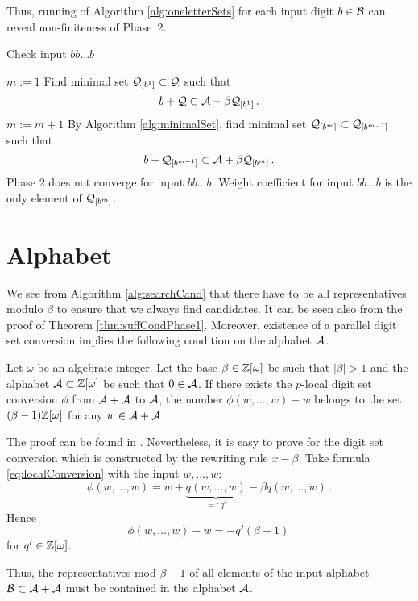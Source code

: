 Thus, running of Algorithm \ref{alg:oneletterSets} for each input digit $b\in\mathcal{B}$ can reveal non-finiteness of Phase~2.

\begin{algorithm}
  \caption{Check input $bb\dots b$}
    \label{alg:oneletterSets}
  \begin{algorithmic}[1]
    \STATE $m:=1$
    \STATE Find minimal set $\mathcal{Q}_{[b^{1}]} \subset \mathcal{Q}$ such that
      $$
      b + \mathcal{Q} \subset \mathcal{A} + \beta \mathcal{Q}_{[b^{1}]}\,.
      $$
      \vspace{-20pt}
        \STATE $m:= m +1$
        \STATE By Algorithm \ref{alg:minimalSet}, find minimal set $\mathcal{Q}_{[b^{m}]} \subset \mathcal{Q}_{[b^{m-1}]}$ such that
          $$
          b + \mathcal{Q}_{[b^{m-1}]} \subset \mathcal{A} + \beta \mathcal{Q}_{[b^{m}]}\,.
          $$  
          \vspace{-20pt}
            \RETURN Phase 2 does not converge for input $bb\dots b$.
        \ENDIF
    \ENDWHILE  
    \RETURN Weight coefficient for input $bb\dots b$ is the only element of $\mathcal{Q}_{[b^{m}]}$.
  \end{algorithmic}
\end{algorithm}


\section{Alphabet}
\label{sec:alphabet}
We see from Algorithm \ref{alg:searchCand} that there have to be all representatives modulo $\beta$ to ensure that we always find candidates. It can be seen also from the proof of Theorem \ref{thm:suffCondPhase1}. Moreover, existence of a parallel digit set conversion implies the following condition on the alphabet $\mathcal{A}$.   
\begin{theo}
Let $\omega$ be an algebraic integer. Let the base $\beta\in\mathbb{Z}[\omega]$ be such that $|\beta|>1$ and the alphabet $\mathcal{A}\subset\mathbb{Z}[\omega]$ be such that $0\in\mathcal{A}$. If there exists the $p$-local digit set conversion $\phi$ from  $\mathcal{A}+\mathcal{A}$ to $\mathcal{A}$, the number $\phi(w,\dots,w)-w$ belongs to the set $(\beta-1)\mathbb{Z}[\omega]$ for any $w\in\mathcal{A}+\mathcal{A}$. 
\end{theo}
The proof can be found in \cite{minAlph}. Nevertheless, it is easy to prove for the digit set conversion which is constructed by the rewriting rule $x-\beta$. Take formula \ref{eq:localConversion} with the input $w,\dots,w$:
$$
    \phi(w, \dots, w)=w+ \underbrace{q(w, \dots, w)}_{=:q'} - \beta q(w, \dots, w)\,.
$$
Hence
$$
\phi(w, \dots, w)-w=-q'(\beta-1)\,
$$
for $q'\in\mathbb{Z}[\omega]$.

Thus, the representatives mod $\beta-1$ of all elements of the input alphabet $\mathcal{B}\subset\mathcal{A}+\mathcal{A}$ must be contained in the alphabet $\mathcal{A}$. 
